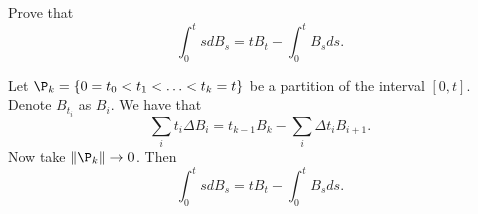 \begin{exercise}{3.1}\label{ex:3.1}
    Prove that 
    \begin{equation*}
        \int_0^t sdB_s = tB_t - \int_0^t B_sds.
    \end{equation*}
\end{exercise}
\begin{solution}
    Let $\P_k = \set{0 = t_0 < t_1 < \ldots < t_k = t}$ be a partition of the 
    interval $[0, t]$. Denote $B_{t_i}$ as $B_i$. We have 
    that 
    \begin{equation*}
        \sum_i t_i\Delta B_i = t_{k-1}B_k - \sum_i \Delta t_i B_{i+1}.
    \end{equation*}
    Now take $\norm{\P_k}\to 0$. Then 
    \begin{equation*}
        \int_0^t sdB_s = tB_t - \int_0^t B_sds.
    \end{equation*}
\end{solution}

